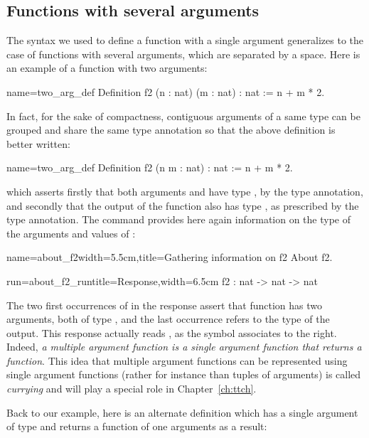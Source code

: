 \subsection{Functions with several arguments}
\label{sec:fun-sev-args}
The syntax we used to define a function with a single argument
generalizes to the case of functions with several arguments, which are
separated by a space. Here is an example of a function with two
arguments:

\begin{coq}{name=two_arg_def}{}
Definition f2 (n : nat) (m : nat) : nat :=
  n + m * 2.
\end{coq}
In fact, for the sake of compactness, contiguous arguments of a same
type can be grouped and share the same type annotation so that the
above definition is better written:

\begin{coq}{name=two_arg_def}{}
Definition f2 (n m : nat) : nat :=
  n + m * 2.
\end{coq}
which asserts firstly that both arguments  and  have type
, by the  type annotation, and secondly that the
output of the function also has type , as prescribed by the
 type annotation. The   command provides
here again information on the type of the arguments and values of
:
\begin{coq}{name=about_f2}{width=5.5cm,title=Gathering information on f2}
About f2.
\end{coq}
\begin{coqout}{run=about_f2_run}{title=Response,width=6.5cm}
f2 : nat -> nat -> nat
\end{coqout}
The two first occurrences of  in the response
  assert that function  has two arguments,
 both of type , and the last occurrence refers to the type of
 the output. This response actually reads ,
 as the \C{->} symbol associates to the right. Indeed, {\em a multiple
 argument function is a single argument function that returns a
 function}.  This idea that multiple argument functions can be
represented using single argument functions (rather for instance than
tuples of arguments) is called {\em currying} and will play a special
role in Chapter~\ref{ch:ttch}.


Back to our example, here is an alternate definition
  which has a single argument  of type  and returns
 a function of one arguments as a result:

